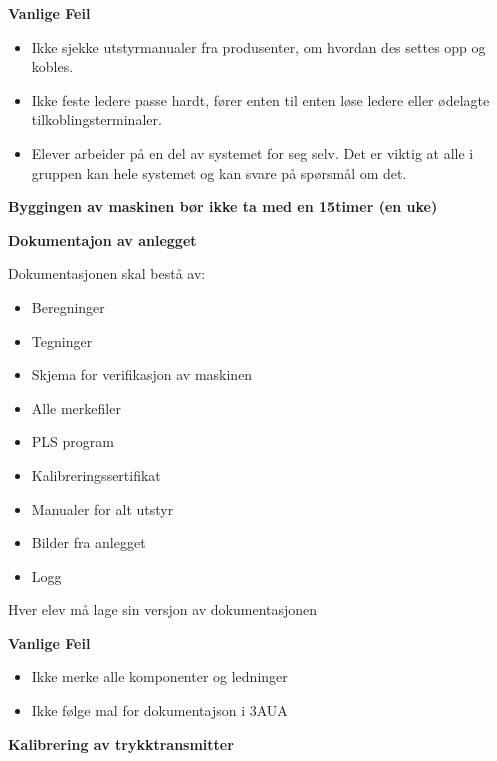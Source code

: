 \vskip 10pt

\textbf{Vanlige Feil}
\begin{itemize}[noitemsep]
	\item Ikke sjekke utstyrmanualer fra produsenter, om hvordan des settes opp og kobles. 
	\item Ikke feste ledere passe hardt, fører enten til enten løse ledere eller ødelagte tilkoblingsterminaler.
	\item Elever arbeider på en del av systemet for seg selv. Det er viktig at alle i gruppen kan hele systemet og kan svare på spørsmål om det.  
\end{itemize}

\vskip 10pt 

\textbf{Byggingen av maskinen bør ikke ta med en 15timer (en uke)}

\vfil \eject

\noindent
\textbf{Dokumentajon av anlegget}

\vskip 10pt 
Dokumentasjonen skal bestå av:
\begin{itemize}[noitemsep]
	\item Beregninger
	\item Tegninger
	\item Skjema for verifikasjon av maskinen
	\item Alle merkefiler
	\item PLS program
	\item Kalibreringssertifikat
	\item Manualer for alt utstyr
	\item Bilder fra anlegget
	\item Logg
\end{itemize}


Hver elev må lage sin versjon av dokumentasjonen





\vskip 10pt

\textbf{Vanlige Feil}
\vskip 10pt
\begin{itemize}[noitemsep]
	\item Ikke merke alle komponenter og ledninger
	\item Ikke følge mal for dokumentajson i 3AUA
\end{itemize}


\vskip 10pt






\vfil \eject

\noindent
\textbf{Kalibrering av trykktransmitter}

